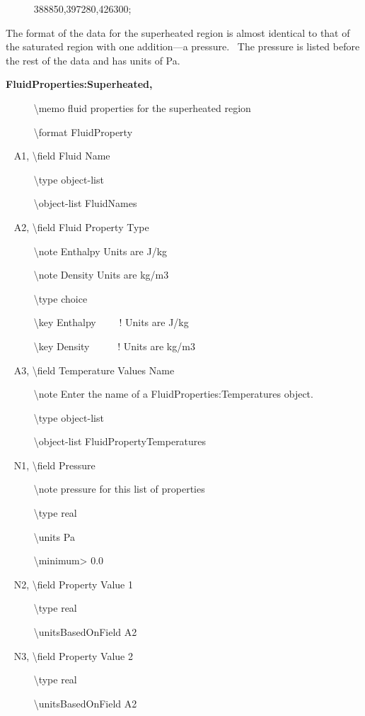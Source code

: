 ~~~~~ 388850,397280,426300;

The format of the data for the superheated region is almost identical to that of the saturated region with one addition---a pressure.~ The pressure is listed before the rest of the data and has units of Pa.

\textbf{FluidProperties:Superheated,}

~~~~~ \textbackslash{}memo fluid properties for the superheated region

~~~~~ \textbackslash{}format FluidProperty

~ A1, \textbackslash{}field Fluid Name

~~~~~ \textbackslash{}type object-list

~~~~~ \textbackslash{}object-list FluidNames

~ A2, \textbackslash{}field Fluid Property Type

~~~~~ \textbackslash{}note Enthalpy Units are J/kg

~~~~~ \textbackslash{}note Density Units are kg/m3

~~~~~ \textbackslash{}type choice

~~~~~ \textbackslash{}key Enthalpy~~~~ ! Units are J/kg

~~~~~ \textbackslash{}key Density~~~~~ ! Units are kg/m3

~ A3, \textbackslash{}field Temperature Values Name

~~~~~ \textbackslash{}note Enter the name of a FluidProperties:Temperatures object.

~~~~~ \textbackslash{}type object-list

~~~~~ \textbackslash{}object-list FluidPropertyTemperatures

~ N1, \textbackslash{}field Pressure

~~~~~ \textbackslash{}note pressure for this list of properties

~~~~~ \textbackslash{}type real

~~~~~ \textbackslash{}units Pa

~~~~~ \textbackslash{}minimum\textgreater{} 0.0

~ N2, \textbackslash{}field Property Value 1

~~~~~ \textbackslash{}type real

~~~~~ \textbackslash{}unitsBasedOnField A2

~ N3, \textbackslash{}field Property Value 2

~~~~~ \textbackslash{}type real

~~~~~ \textbackslash{}unitsBasedOnField A2

